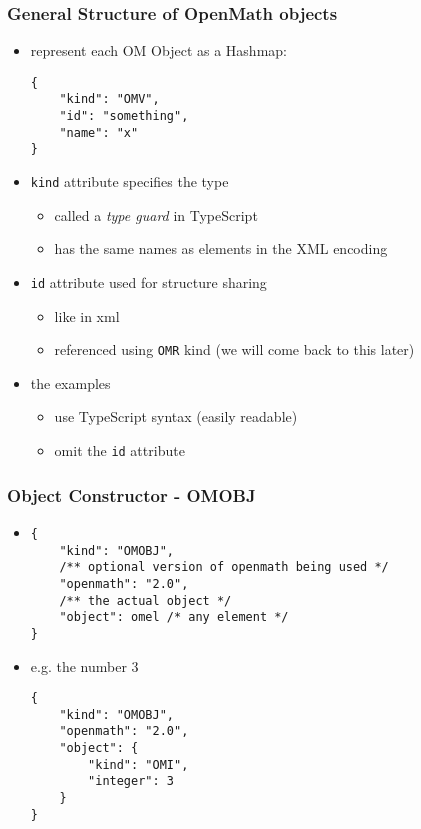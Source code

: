 \documentclass[usenames,dvipsnames]{beamer}
\begin{document}

\begin{frame}[fragile]
    \frametitle{General Structure of OpenMath objects}
    \begin{itemize}
        \item represent each OM Object as a Hashmap:
\begin{lstlisting}
{
    "kind": "OMV",
    "id": "something",
    "name": "x"
}
\end{lstlisting}
        \item \texttt{kind} attribute specifies the type
        \begin{itemize}
            \item called a \textit{type guard} in TypeScript
            \item has the same names as elements in the XML encoding
        \end{itemize}
        \item \texttt{id} attribute used for structure sharing
        \begin{itemize}
            \item like in xml
            \item referenced using \texttt{OMR} kind (we will come back to this later)
        \end{itemize}
        \item the examples
        \begin{itemize}
            \item use TypeScript syntax (easily readable)
            \item omit the \texttt{id} attribute
        \end{itemize}
    \end{itemize}
\end{frame}


\begin{frame}[fragile]
    \frametitle{Object Constructor - OMOBJ}
    \begin{itemize}
        \item
\begin{lstlisting}
{
    "kind": "OMOBJ",
    /** optional version of openmath being used */
    "openmath": "2.0",
    /** the actual object */
    "object": omel /* any element */
}
\end{lstlisting}
        \item e.g. the number $3$
\begin{lstlisting}
{
    "kind": "OMOBJ",
    "openmath": "2.0",
    "object": {
        "kind": "OMI", 
        "integer": 3
    }
}
\end{lstlisting}
    \end{itemize}
\end{frame}
\end{document}

